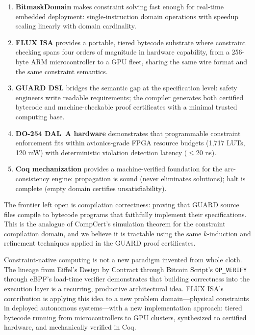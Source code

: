 \documentclass[sigplan,10pt,review]{acmart}
\begin{document}
\begin{enumerate}
  \item \textbf{BitmaskDomain} makes constraint solving fast enough for real-time
    embedded deployment: single-instruction domain operations with speedup scaling
    linearly with domain cardinality.

  \item \textbf{FLUX ISA} provides a portable, tiered bytecode substrate where
    constraint checking spans four orders of magnitude in hardware capability, from
    a 256-byte ARM microcontroller to a GPU fleet, sharing the same wire format
    and the same constraint semantics.

  \item \textbf{GUARD DSL} bridges the semantic gap at the specification level:
    safety engineers write readable requirements; the compiler generates both
    certified bytecode and machine-checkable proof certificates with a minimal
    trusted computing base.

  \item \textbf{DO-254 DAL~A hardware} demonstrates that programmable constraint
    enforcement fits within avionics-grade FPGA resource budgets (1,717 LUTs,
    120 mW) with deterministic violation detection latency ($\leq$20 ns).

  \item \textbf{Coq mechanization} provides a machine-verified foundation for the
    arc-consistency engine: propagation is sound (never eliminates solutions); halt
    is complete (empty domain certifies unsatisfiability).
\end{enumerate}

\noindent The frontier left open is compilation correctness: proving that GUARD
source files compile to bytecode programs that faithfully implement their specifications.
This is the analogue of CompCert's simulation theorem for the constraint compilation
domain, and we believe it is tractable using the same $k$-induction and refinement
techniques applied in the GUARD proof certificates.

Constraint-native computing is not a new paradigm invented from whole cloth.
The lineage from Eiffel's Design by Contract through Bitcoin Script's
\texttt{OP\_VERIFY} through eBPF's load-time verifier demonstrates that building
correctness into the execution layer is a recurring, productive architectural idea.
FLUX ISA's contribution is applying this idea to a new problem domain---physical
constraints in deployed autonomous systems---with a new implementation approach:
tiered bytecode running from microcontrollers to GPU clusters, synthesized to
certified hardware, and mechanically verified in Coq.
\end{document}
